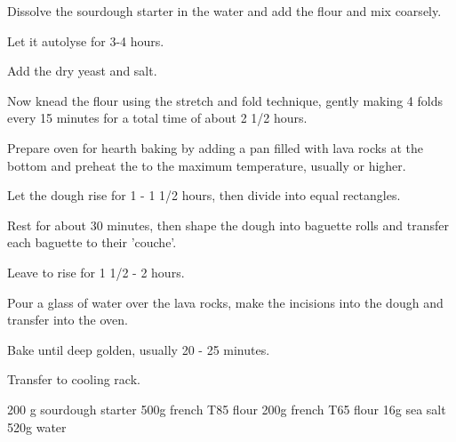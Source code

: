 \begin{method}		
     	Dissolve the sourdough starter in the water and add the flour and mix coarsely.

	Let it autolyse for 3-4 hours.

	Add the dry yeast and salt.

	Now knead the flour using the stretch and fold technique, gently making 4 folds  every 15 minutes for a total time of about 2 1/2 hours.

	Prepare oven for hearth baking by adding a pan filled with lava rocks at the bottom and preheat the to the maximum temperature, usually  or higher.

	Let the dough rise for 1 - 1 1/2 hours, then divide into equal rectangles.

	Rest for about 30 minutes, then shape the dough into baguette rolls and transfer each baguette to their 'couche'.

	Leave to rise for 1 1/2 - 2 hours.

	Pour a glass of water over the lava rocks, make the incisions into the dough and transfer into the oven.

	Bake until deep golden,  usually 20 - 25 minutes.

	Transfer to cooling rack.

\end {method}

\label{rec:bread-campagne}

\begin{ingreds}
	200 g sourdough starter
	500g french T85 flour
	200g french T65 flour
	16g sea salt
	520g water
\end{ingreds}

